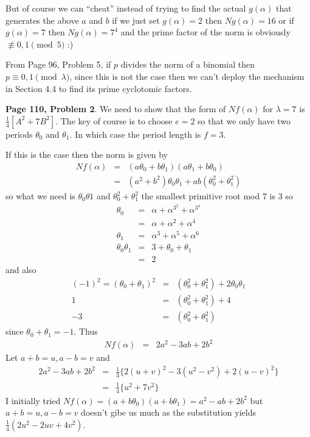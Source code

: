 \documentclass[aps,preprint,preprintnumbers,nofootinbib,showpacs,prd]{revtex4-1}
\newcommand{\nbea}{\begin{eqnarray*}}
\newcommand{\neea}{\end{eqnarray*}}
\begin{document}
But of course we can ``cheat'' instead of trying to find the actual $g(\alpha)$ that generates the above $a$ and $b$ if we just set $g(\alpha) = 2$ then $Ng(\alpha) = 16$ or if $g(\alpha) = 7$ then $Ng(\alpha) = 7^4$ and the prime factor of the norm is obviously $\not\equiv 0,1 \pmod{5}$ :)

From Page 96, Problem 5, if $p$ divides the norm of a binomial then $p \equiv 0,1 \pmod{\lambda}$, since this is not the case then we can't deploy the mechanism in Section 4.4 to find its prime cyclotomic factors.

{\bf Page 110, Problem 2}. We need to show that the form of $Nf(\alpha)$ for $\lambda = 7$ is $\frac{1}{4}[A^2 + 7B^2]$. The key of course is to choose $e=2$ so that we only have two periods $\theta_0$ and $\theta_1$. In which case the period length is $f = 3$.

If this is the case then the norm is given by 
%
\nbea
Nf(\alpha) & = & (a\theta_0 + b\theta_1)(a\theta_1 + b\theta_0) \\
& = & (a^2 + b^2)\theta_0\theta_1  + ab(\theta^2_0 + \theta^2_1)
\neea
%
so what we need is $\theta_0\theta1$ and $\theta^2_0 + \theta^2_1$ the smallest primitive root mod 7 is 3 so
%
\nbea
\theta_0 & = & \alpha + \alpha^{3^2} + \alpha^{3^4} \\
& = & \alpha + \alpha^2 + \alpha^4 \\
\theta_1 & = & \alpha^3 + \alpha^5 + \alpha^6 \\
\theta_0\theta_1 & = & 3 + \theta_0  + \theta_1 \\
& = & 2
\neea
%
and also
%
\nbea
(-1)^2 = (\theta_0 + \theta_1)^2 & = & (\theta^2_0 + \theta^2_1) + 2\theta_0\theta_1 \\
1 & = & (\theta^2_0 + \theta^2_1) + 4 \\
-3 & = & (\theta^2_0 + \theta^2_1)
\neea
%
since $\theta_0 + \theta_1 = -1$. Thus
%
\nbea
Nf(\alpha) & = & 2a^2 -3 ab + 2b^2
\neea
%
Let $a + b = u, a - b = v$ and
%
\nbea
2a^2 -3 ab + 2b^2 & = & \tfrac{1}{4} \{2(u + v)^2 - 3(u^2 - v^2) + 2(u - v)^2 \} \\
& = & \tfrac{1}{4} \{u^2 + 7 v^2 \} 
\neea
%
I initially tried $Nf(\alpha) = (a + b\theta_0)(a + b\theta_1) = a^2 - ab + 2b^2$ but $a + b = u, a - b = v$ doesn't gibe us much as the substitution yields $\frac{1}{4}(2u^2 - 2uv + 4v^2)$.
\end{document}
